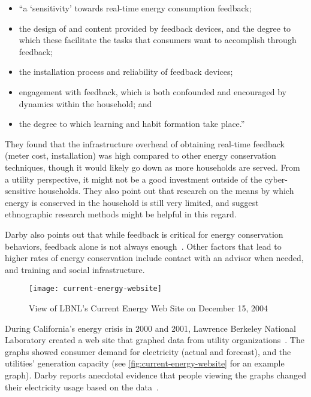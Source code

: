 \begin{itemize}
	\item ``a `sensitivity' towards real-time energy consumption feedback;
	\item the design of and content provided by feedback devices, and the degree to which these facilitate the tasks that consumers want to accomplish through feedback;
	\item the installation process and reliability of feedback devices;
	\item engagement with feedback, which is both confounded and encouraged by dynamics within the household; and
	\item the degree to which learning and habit formation take place.''
\end{itemize}

They found that the infrastructure overhead of obtaining real-time feedback (meter cost, installation) was high compared to other energy conservation techniques, though it would likely go down as more households are served. From a utility perspective, it might not be a good investment outside of the cyber-sensitive households. They also point out that research on the means by which energy is conserved in the household is still very limited, and suggest ethnographic research methods might be helpful in this regard.

Darby also points out that while feedback is critical for energy conservation behaviors, feedback alone is not always enough~\cite{darby-2000-making-it-obvious}. Other factors that lead to higher rates of energy conservation include contact with an advisor when needed, and training and social infrastructure.

\begin{figure}[htbp]
	\centering
		\texttt{[image: current-energy-website]}
		\caption{View of LBNL's Current Energy Web Site on December 15, 2004}
		\label{fig:current-energy-website}
\end{figure}

During California's energy crisis in 2000 and 2001, Lawrence Berkeley National Laboratory created a web site that graphed data from utility organizations~\cite{Bartholomew2008Current-Energy}. The graphs showed consumer demand for electricity (actual and forecast), and the utilities' generation capacity (see \autoref{fig:current-energy-website} for an example graph). Darby reports anecdotal evidence that people viewing the graphs changed their electricity usage based on the data~\cite{darby-review-2006}.

